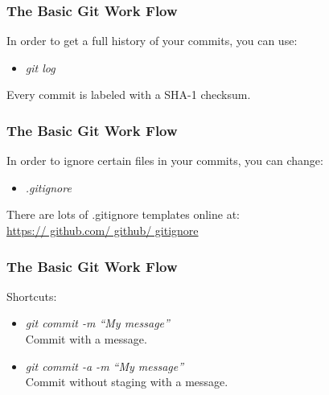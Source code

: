 \begin{frame}
\frametitle{\large The Basic Git Work Flow}
In order to get a full history of your commits, you can use:
\begin{itemize}
\item \emph{git log}
\end{itemize}
\vspace{3mm}
Every commit is labeled with a SHA-1 checksum.
\end{frame}
\note{}

\begin{frame}
\frametitle{\large The Basic Git Work Flow}
In order to ignore certain files in your commits, you can change:
\begin{itemize}
\item \emph{.gitignore}
\end{itemize}
\vspace{3mm}
There are lots of .gitignore templates online at: \\
\href{https:// github.com/ github/ gitignore}{https:// github.com/ github/ gitignore}
\end{frame}
\note{}

\begin{frame}
\frametitle{\large The Basic Git Work Flow}
Shortcuts:
\begin{itemize}
\item \emph{git commit -m ``My message''}\\
Commit with a message.
\item \emph{git commit -a -m ``My message''}\\
Commit without staging with a message.
\end{itemize}
\end{frame}
\note{}